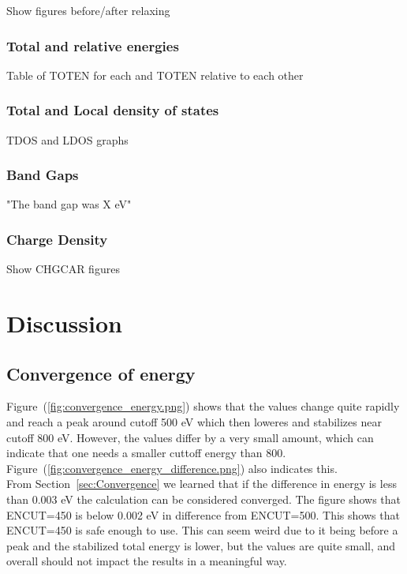 \documentclass{article}
\begin{document}
      Show figures before/after relaxing

    \subsubsection{Total and relative energies}

      Table of TOTEN for each and TOTEN relative to each other

    \subsubsection{Total and Local density of states}

      TDOS and LDOS graphs

    \subsubsection{Band Gaps}

      "The band gap was X eV"

    \subsubsection{Charge Density}

      Show CHGCAR figures

\vspace{1cm}

\section{Discussion}    \label{sec:Discussion}

  \subsection{Convergence of energy}

    Figure~(\ref{fig:convergence_energy.png}) shows that the values change quite rapidly and reach a peak around cutoff 500 eV which then loweres and stabilizes near cutoff 800 eV. However, the values differ by a very small amount, which can indicate that one needs a smaller cuttoff energy than 800. Figure~(\ref{fig:convergence_energy_difference.png}) also indicates this. \\

    From Section~\ref{sec:Convergence} we learned that if the difference in energy is less than 0.003 eV the calculation can be considered converged. The figure shows that ENCUT=450 is below 0.002 eV in difference from ENCUT=500. This shows that ENCUT=450 is safe enough to use. This can seem weird due to it being before a peak and the stabilized total energy is lower, but the values are quite small, and overall should not impact the results in a meaningful way. \\
\end{document}

